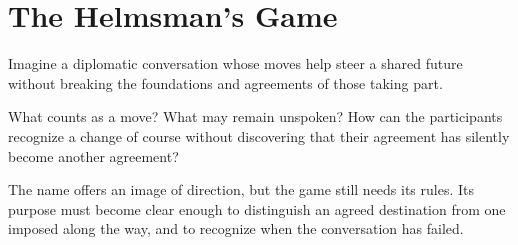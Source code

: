 \chapter{The Helmsman's Game}
\label{short:helmsmans-game}

Imagine a diplomatic conversation whose moves help steer a shared future
without breaking the foundations and agreements of those taking part.

What counts as a move? What may remain unspoken? How can the participants
recognize a change of course without discovering that their agreement has
silently become another agreement?

The name offers an image of direction, but the game still needs its rules.
Its purpose must become clear enough to distinguish an agreed destination
from one imposed along the way, and to recognize when the conversation has
failed.

